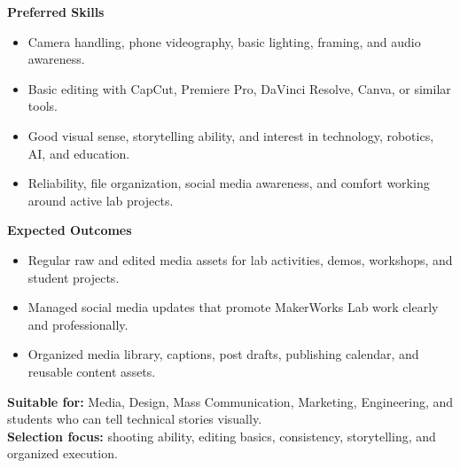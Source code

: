 \documentclass[10pt,a4paper]{article}
\newcommand{\RoleSection}[1]{\vspace{5pt}\par\noindent\textbf{#1}\par\vspace{2pt}}
\begin{document}
{\RoleSection{Preferred Skills}
\begin{itemize}
  \item Camera handling, phone videography, basic lighting, framing, and audio awareness.
  \item Basic editing with CapCut, Premiere Pro, DaVinci Resolve, Canva, or similar tools.
  \item Good visual sense, storytelling ability, and interest in technology, robotics, AI, and education.
  \item Reliability, file organization, social media awareness, and comfort working around active lab projects.
\end{itemize}

\RoleSection{Expected Outcomes}
\begin{itemize}
  \item Regular raw and edited media assets for lab activities, demos, workshops, and student projects.
  \item Managed social media updates that promote MakerWorks Lab work clearly and professionally.
  \item Organized media library, captions, post drafts, publishing calendar, and reusable content assets.
\end{itemize}

\textbf{Suitable for:} Media, Design, Mass Communication, Marketing, Engineering, and students who can tell technical stories visually.\\
\textbf{Selection focus:} shooting ability, editing basics, consistency, storytelling, and organized execution.
}
\end{document}
